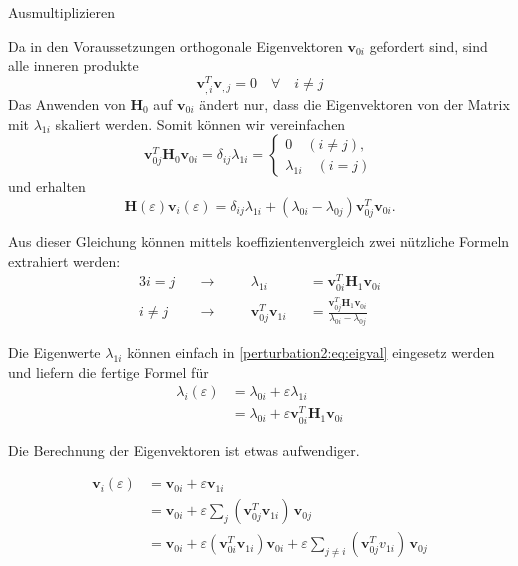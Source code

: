 Ausmultiplizieren

Da in den Voraussetzungen orthogonale Eigenvektoren $\bm v_{0i}$ gefordert sind, sind alle inneren produkte
\begin{equation}
    \bm v_{,i}^T \bm v_{,j} = 0 \quad \forall \quad i \neq j
\end{equation}
Das Anwenden von $\bm H_0$ auf $\bm v_{0i}$ ändert nur, dass die Eigenvektoren von der Matrix mit $\lambda_{1i}$ skaliert werden.
Somit können wir vereinfachen
\begin{equation*}
    \bm v_{0j}^T \bm H_0 \bm v_{0i}
    = \delta_{ij} \lambda_{1i}
    = \begin{cases}
        0 \quad (i \neq j),\\
        \lambda_{1i} \quad (i = j)
        \end{cases}
\end{equation*}
und erhalten
\begin{equation}
    \bm H(\varepsilon) \bm v_i(\varepsilon)
    =
    \delta_{ij} \lambda_{1i} + 
    ( \lambda_{0i} - \lambda_{0j} )
    \bm v_{0j}^T  \bm v_{0i} .
\end{equation}


Aus dieser Gleichung können mittels koeffizientenvergleich zwei nützliche Formeln extrahiert werden:
\begin{alignat*}{3}
    i = j \quad & \rightarrow  \quad && \lambda_{1i}&& = \bm v_{0i}^T \bm H_1 \bm v_{0i} \\
    i \neq j \quad & \rightarrow \quad && \bm v_{0j}^T \bm v_{1i}&& = \frac{\bm v_{0j}^T \bm H_1 \bm v_{0i}}{\lambda_{0i} - \lambda_{0j}}
\end{alignat*}

Die Eigenwerte $\lambda_{1i}$ können einfach in \ref{perturbation2:eq:eigval} eingesetz werden und liefern die fertige Formel für   
\begin{align*}
    \lambda_i(\varepsilon)
    &=
    \lambda_{0i} + \varepsilon \lambda_{1i} \\
    &=
    \lambda_{0i} + \varepsilon \bm v_{0i}^T \bm H_1 \bm v_{0i}
\end{align*}

Die Berechnung der Eigenvektoren ist etwas aufwendiger.


\begin{align*}
    \bm v_i(\varepsilon)
    &=
    \bm v_{0i} + \varepsilon \bm v_{1i} \\
    &=
    \bm v_{0i} + \varepsilon \sum_{j} ( \bm v_{0j}^T \bm v_{1i}) \, \bm v_{0j} \\
    &=
    \bm v_{0i} + \varepsilon ( \bm v_{0i}^T \bm v_{1i}) \bm v_{0i} + \varepsilon \sum_{j \neq i} (\bm v_{0j}^T v_{1i}) \, \bm v_{0j}
\end{align*}

